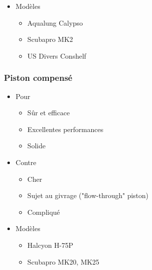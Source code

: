\documentclass[aspectratio=1610,english,12pt]{beamer}
\begin{document}
\begin{frame}{\insertsubsubsection}
	\begin{itemize}
		\item Modèles
		\begin{itemize}
			\item Aqualung Calypso
			\item Scubapro MK2
			\item US Divers Conshelf
		\end{itemize}
	\end{itemize}
\end{frame}

\subsubsection{Piston compensé}
\begin{frame}{\insertsubsubsection}
\end{frame}

\begin{frame}{\insertsubsubsection}
\end{frame}

\begin{frame}{\insertsubsubsection}
\end{frame}

\begin{frame}{\insertsubsubsection}
	\begin{itemize}
		\item Pour
		\begin{itemize}
			\item Sûr et efficace
			\item Excellentes performances
			\item Solide
		\end{itemize}
		\item Contre
		\begin{itemize}
			\item Cher
			\item Sujet au givrage ("flow-through" piston)
			\item Compliqué
		\end{itemize}
	\end{itemize}
\end{frame}

\begin{frame}{\insertsubsubsection}
	\begin{itemize}
		\item Modèles
		\begin{itemize}
			\item Halcyon H-75P
			\item Scubapro MK20, MK25
		\end{itemize}
	\end{itemize}
\end{frame}
\end{document}
